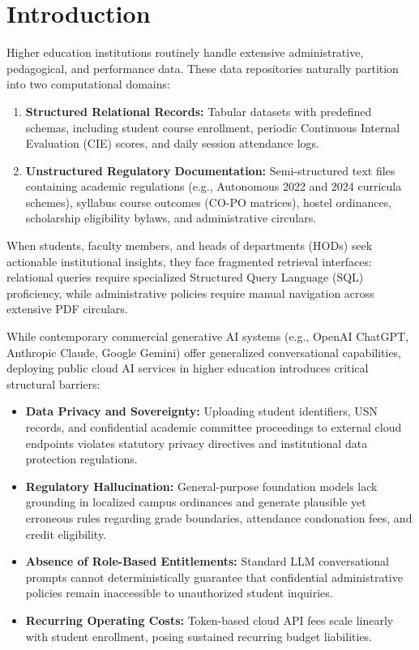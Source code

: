 \documentclass[conference]{IEEEtran}
\begin{document}
\section{Introduction}
Higher education institutions routinely handle extensive administrative, pedagogical, and performance data. These data repositories naturally partition into two computational domains:
\begin{enumerate}
    \item \textbf{Structured Relational Records:} Tabular datasets with predefined schemas, including student course enrollment, periodic Continuous Internal Evaluation (CIE) scores, and daily session attendance logs.
    \item \textbf{Unstructured Regulatory Documentation:} Semi-structured text files containing academic regulations (e.g., Autonomous 2022 and 2024 curricula schemes), syllabus course outcomes (CO-PO matrices), hostel ordinances, scholarship eligibility bylaws, and administrative circulars.
\end{enumerate}

When students, faculty members, and heads of departments (HODs) seek actionable institutional insights, they face fragmented retrieval interfaces: relational queries require specialized Structured Query Language (SQL) proficiency, while administrative policies require manual navigation across extensive PDF circulars.

While contemporary commercial generative AI systems (e.g., OpenAI ChatGPT, Anthropic Claude, Google Gemini) offer generalized conversational capabilities, deploying public cloud AI services in higher education introduces critical structural barriers:
\begin{itemize}
    \item \textbf{Data Privacy and Sovereignty:} Uploading student identifiers, USN records, and confidential academic committee proceedings to external cloud endpoints violates statutory privacy directives and institutional data protection regulations.
    \item \textbf{Regulatory Hallucination:} General-purpose foundation models lack grounding in localized campus ordinances and generate plausible yet erroneous rules regarding grade boundaries, attendance condonation fees, and credit eligibility.
    \item \textbf{Absence of Role-Based Entitlements:} Standard LLM conversational prompts cannot deterministically guarantee that confidential administrative policies remain inaccessible to unauthorized student inquiries.
    \item \textbf{Recurring Operating Costs:} Token-based cloud API fees scale linearly with student enrollment, posing sustained recurring budget liabilities.
\end{itemize}
\end{document}
